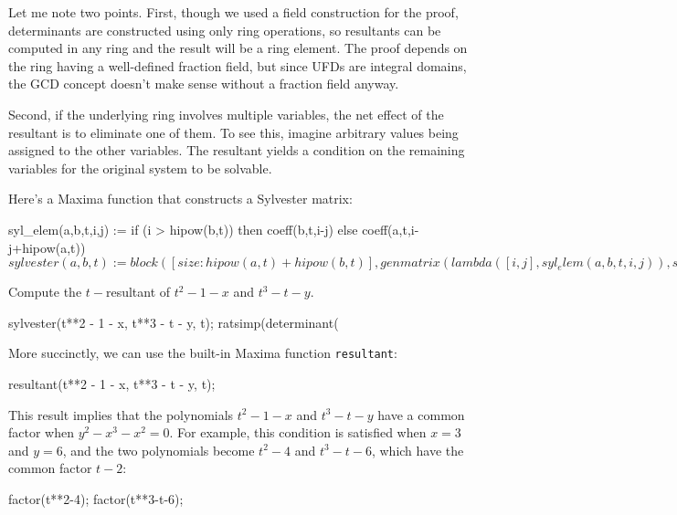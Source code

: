 Let me note two points.  First, though we used a field construction
for the proof, determinants are constructed using only ring
operations, so resultants can be computed in any ring and the result
will be a ring element.  The proof depends on the ring having a
well-defined fraction field, but since UFDs are integral domains, the
GCD concept doesn't make sense without a fraction field anyway.

Second, if the underlying ring involves multiple variables, the net
effect of the resultant is to eliminate one of them.  To see this,
imagine arbitrary values being assigned to the other variables.  The
resultant yields a condition on the remaining variables for the
original system to be solvable.


\vfill\eject

Here's a Maxima function that constructs a Sylvester matrix:

\begin{maximablock}
syl_elem(a,b,t,i,j) :=
   if (i > hipow(b,t))
      then coeff(b,t,i-j)
      else coeff(a,t,i-j+hipow(a,t))$
sylvester(a,b,t) := block(
   [size: hipow(a,t) + hipow(b,t)],
   genmatrix(lambda([i,j], syl_elem(a,b,t,i,j)),
             size, size)
)$
\end{maximablock}

\example Compute the $t-$resultant of $t^2 - 1 -x$ and $t^3-t-y$.

\begin{maximablock}

sylvester(t**2 - 1 - x, t**3 - t - y, t);
ratsimp(determinant(%
\end{maximablock}

More succinctly, we can use the built-in Maxima function {\tt resultant}:

\begin{maximablock}
resultant(t**2 - 1 - x, t**3 - t - y, t);
\end{maximablock}

This result implies that the polynomials $t^2-1-x$ and $t^3-t-y$
have a common factor when $y^2-x^3-x^2=0$.  For example,
this condition is satisfied when $x=3$ and $y=6$, and
the two polynomials become $t^2-4$ and $t^3-t-6$, which
have the common factor $t-2$:

\begin{maximablock}
factor(t**2-4);
factor(t**3-t-6);
\end{maximablock}

\endexample


\vfill\eject

